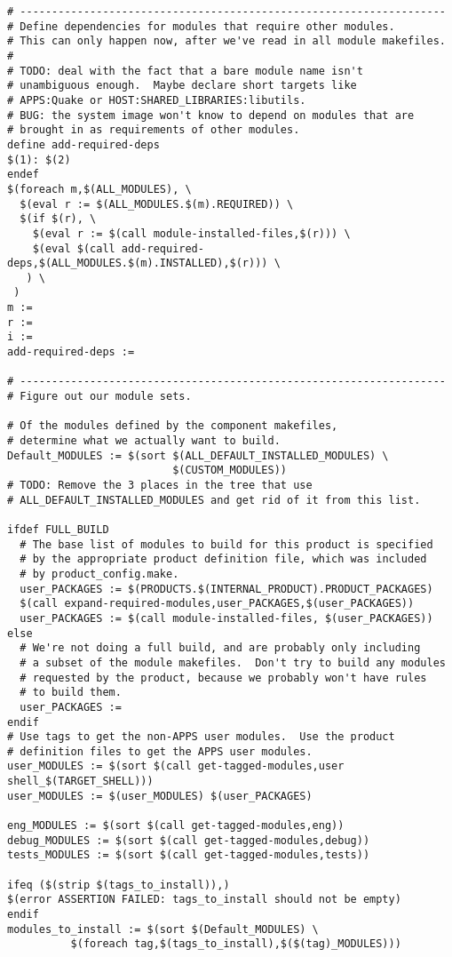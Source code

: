 \documentclass[12pt,a4paper]{article}
\begin{document}
\begin{verbatim}
# -------------------------------------------------------------------
# Define dependencies for modules that require other modules.
# This can only happen now, after we've read in all module makefiles.
#
# TODO: deal with the fact that a bare module name isn't
# unambiguous enough.  Maybe declare short targets like
# APPS:Quake or HOST:SHARED_LIBRARIES:libutils.
# BUG: the system image won't know to depend on modules that are
# brought in as requirements of other modules.
define add-required-deps
$(1): $(2)
endef
$(foreach m,$(ALL_MODULES), \
  $(eval r := $(ALL_MODULES.$(m).REQUIRED)) \
  $(if $(r), \
    $(eval r := $(call module-installed-files,$(r))) \
    $(eval $(call add-required-deps,$(ALL_MODULES.$(m).INSTALLED),$(r))) \
   ) \
 )
m :=
r :=
i :=
add-required-deps :=

# -------------------------------------------------------------------
# Figure out our module sets.

# Of the modules defined by the component makefiles,
# determine what we actually want to build.
Default_MODULES := $(sort $(ALL_DEFAULT_INSTALLED_MODULES) \
                          $(CUSTOM_MODULES))
# TODO: Remove the 3 places in the tree that use
# ALL_DEFAULT_INSTALLED_MODULES and get rid of it from this list.

ifdef FULL_BUILD
  # The base list of modules to build for this product is specified
  # by the appropriate product definition file, which was included
  # by product_config.make.
  user_PACKAGES := $(PRODUCTS.$(INTERNAL_PRODUCT).PRODUCT_PACKAGES)
  $(call expand-required-modules,user_PACKAGES,$(user_PACKAGES))
  user_PACKAGES := $(call module-installed-files, $(user_PACKAGES))
else
  # We're not doing a full build, and are probably only including
  # a subset of the module makefiles.  Don't try to build any modules
  # requested by the product, because we probably won't have rules
  # to build them.
  user_PACKAGES :=
endif
# Use tags to get the non-APPS user modules.  Use the product
# definition files to get the APPS user modules.
user_MODULES := $(sort $(call get-tagged-modules,user shell_$(TARGET_SHELL)))
user_MODULES := $(user_MODULES) $(user_PACKAGES)

eng_MODULES := $(sort $(call get-tagged-modules,eng))
debug_MODULES := $(sort $(call get-tagged-modules,debug))
tests_MODULES := $(sort $(call get-tagged-modules,tests))

ifeq ($(strip $(tags_to_install)),)
$(error ASSERTION FAILED: tags_to_install should not be empty)
endif
modules_to_install := $(sort $(Default_MODULES) \
          $(foreach tag,$(tags_to_install),$($(tag)_MODULES)))


\end{verbatim}
\end{document}
